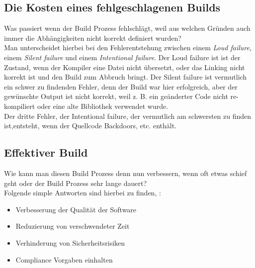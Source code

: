 \subsection{Die Kosten eines fehlgeschlagenen Builds}
Was passiert wenn der Build Prozess fehlschlägt, weil aus welchen Gründen auch immer die Abhängigkeiten nicht korrekt definiert wurden?
\\
Man unterscheidet hierbei bei den Fehlerentstehung zwischen einem \textit{Loud failure}, einem \textit{Silent failure} und einem \textit{Intentional failure}.
Der Loud failure ist ist der Zustand, wenn der Kompiler eine Datei nicht übersetzt, oder das Linking nicht korrekt ist und den Build zum Abbruch bringt.
Der Silent failure ist vermutlich ein schwer zu findenden Fehler, denn der Build war hier erfolgreich, aber der gewünschte Output ist nicht korrekt, weil \acs{z. B.} ein geänderter Code nicht re-kompiliert oder eine alte Bibliothek verwendet wurde.
\\
Der dritte Fehler, der Intentional failure, der vermutlich am  schwersten zu finden ist,entsteht, wenn der Quellcode Backdoors, \acs{etc.} enthält. \cite{software-analysis}

\subsection{Effektiver Build}
Wie kann man diesen Build Prozess denn nun verbessern, wenn oft etwas schief geht oder der Build Prozess sehr lange dauert?
\\
Folgende simple Antworten sind hierbei zu finden, \cite{software-analysis}:
\begin{itemize}
	\item Verbesserung der Qualität der Software
	\item Reduzierung von verschwendeter Zeit
	\item Verhinderung von Sicherheitsrisiken 
	\item Compliance Vorgaben einhalten 
\end{itemize}
